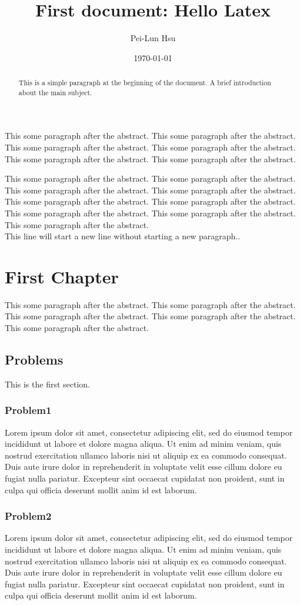 \documentclass[12pt, a4paper]{report}
\title{First document: Hello Latex}
\author{Pei-Lun Hsu}
\date{\today}
\begin{document}
\maketitle
\begin{abstract}
    This is a simple paragraph at the beginning of the document. A brief introduction about the main subject.
\end{abstract}
This some paragraph after the abstract. This some paragraph after the abstract. This some paragraph after the abstract. This some paragraph after the abstract. This some paragraph after the abstract. This some paragraph after the abstract. 

This some paragraph after the abstract. This some paragraph after the abstract. This some paragraph after the abstract. This some paragraph after the abstract. This some paragraph after the abstract. This some paragraph after the abstract. This some paragraph after the abstract. This some paragraph after the abstract. This some paragraph after the abstract. \\This line will start a new line without starting a new paragraph..

\chapter{First Chapter}
This some paragraph after the abstract. This some paragraph after the abstract. This some paragraph after the abstract. This some paragraph after the abstract. This some paragraph after the abstract.

\section{Problems}
This is the first section.
\subsection{Problem1}
Lorem ipsum dolor sit amet, consectetur adipiscing elit, sed do eiusmod tempor incididunt ut labore et dolore magna aliqua. Ut enim ad minim veniam, quis nostrud exercitation ullamco laboris nisi ut aliquip ex ea commodo consequat. Duis aute irure dolor in reprehenderit in voluptate velit esse cillum dolore eu fugiat nulla pariatur. Excepteur sint occaecat cupidatat non proident, sunt in culpa qui officia deserunt mollit anim id est laborum.
\subsection{Problem2}
Lorem ipsum dolor sit amet, consectetur adipiscing elit, sed do eiusmod tempor incididunt ut labore et dolore magna aliqua. Ut enim ad minim veniam, quis nostrud exercitation ullamco laboris nisi ut aliquip ex ea commodo consequat. Duis aute irure dolor in reprehenderit in voluptate velit esse cillum dolore eu fugiat nulla pariatur. Excepteur sint occaecat cupidatat non proident, sunt in culpa qui officia deserunt mollit anim id est laborum.
\end{document}
